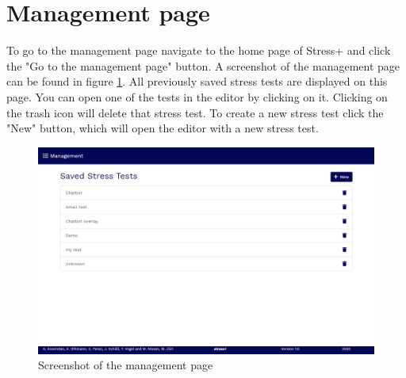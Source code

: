 \section{Management page}
\label{sec:management-page}

To go to the management page navigate to the home page of Stress+ and click the "Go to the management page" button.
A screenshot of the management page can be found in figure \ref{fig:screenshot-management-page}.
All previously saved stress tests are displayed on this page.
You can open one of the tests in the editor by clicking on it.
Clicking on the trash icon will delete that stress test.
To create a new stress test click the "New" button, which will open the editor with a new stress test.

\begin{figure}[htb]
    \centering
    \includegraphics[width=\textwidth]{figures/screenshot-management-page.png}
    \caption{Screenshot of the management page}
    \label{fig:screenshot-management-page}
\end{figure}
